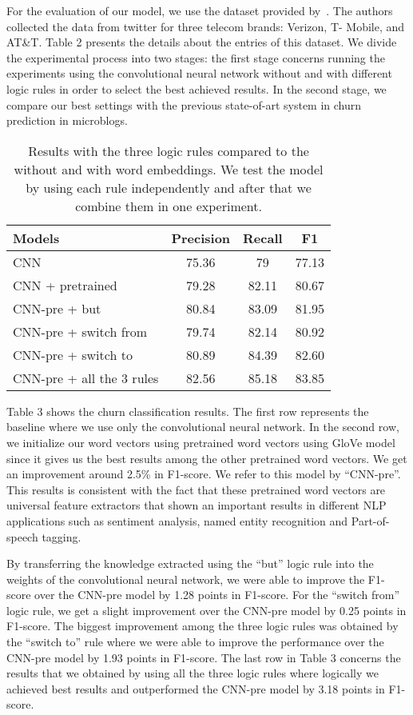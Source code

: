 \documentclass[11pt,letterpaper]{article}
\begin{document}
For the evaluation of our model, we use the dataset provided by~\cite{amiri2015}. The authors collected the data from twitter for three telecom brands: Verizon, T- Mobile, and AT\&T. Table 2 presents the details about the entries of this dataset. We divide the experimental process into two stages: the first stage concerns running the experiments using the convolutional neural network without and with different logic rules in order to select the best achieved results. In the second stage, we compare our best settings with the previous state-of-art system in churn prediction in microblogs.

\begin{table}
\small
\centering
\begin{tabular}{|l|c|c|c|}
\hline \bf Models & \bf Precision & \bf Recall & \bf F1 \\ \hline

CNN & 75.36 & 79 & 77.13 \\
CNN + pretrained & 79.28 & 82.11 & 80.67 \\
CNN-pre + but & 80.84 & 83.09 & 81.95 \\
CNN-pre + switch from & 79.74 & 82.14 & 80.92 \\
CNN-pre + switch to & 80.89 & 84.39 & 82.60 \\
CNN-pre + all the 3 rules & 82.56 & 85.18 & 83.85 \\

\hline
\end{tabular}
\caption{Results with the three logic rules compared to the without and with word embeddings. We test the model by using each rule independently and after that we combine them in one experiment.}
\end{table}

Table 3 shows the churn classification results. The first row represents the baseline where we use only the convolutional neural network. In the second row, we initialize our word vectors using pretrained word vectors using GloVe model since it gives us the best results among the other pretrained word vectors. We get an improvement around 2.5\% in F1-score. We refer to this model by \enquote{CNN-pre}. This results is consistent with the fact that these pretrained word vectors are universal feature extractors that shown an important results in different NLP applications such as sentiment analysis, named entity recognition and Part-of-speech tagging. 

By transferring the knowledge extracted using the \enquote{but} logic rule into the weights of the convolutional neural network, we were able to improve the F1-score over the CNN-pre model by 1.28 points in F1-score. For the \enquote{switch from} logic rule, we get a slight improvement over the CNN-pre model by 0.25 points in F1-score. The biggest improvement among the three logic rules was obtained by the \enquote{switch to} rule where we were able to improve the performance over the CNN-pre model by 1.93 points in F1-score. The last row in Table 3 concerns the results that we obtained by using all the three logic rules where logically we achieved best results and outperformed the CNN-pre model by 3.18 points in F1-score.
\end{document}
